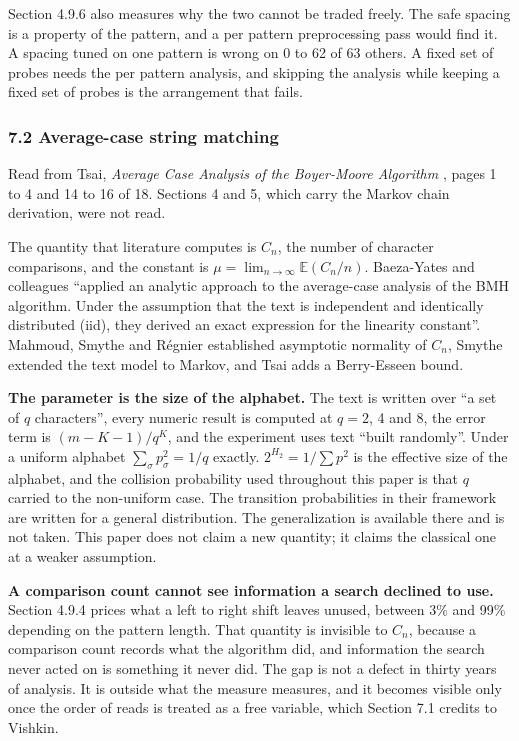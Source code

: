 Section 4.9.6 also measures why the two cannot be traded freely. The safe spacing is a property of the pattern, and a per pattern preprocessing pass would find it. A spacing tuned on one pattern is wrong on 0 to 62 of 63 others. A fixed set of probes needs the per pattern analysis, and skipping the analysis while keeping a fixed set of probes is the arrangement that fails.

\subsubsection{7.2 Average-case string matching}

Read from Tsai, \emph{Average Case Analysis of the Boyer-Moore Algorithm} \cite{src:Tsai}, pages 1 to 4 and 14 to 16 of 18. Sections 4 and 5, which carry the Markov chain derivation, were not read.

The quantity that literature computes is \(C_n\), the number of character comparisons, and the constant is \(\mu = \lim_{n\to\infty} \mathbb{E}(C_n/n)\). Baeza-Yates and colleagues ``applied an analytic approach to the average-case analysis of the BMH algorithm. Under the assumption that the text is independent and identically distributed (iid), they derived an exact expression for the linearity constant''. Mahmoud, Smythe and Régnier established asymptotic normality of \(C_n\), Smythe extended the text model to Markov, and Tsai adds a Berry-Esseen bound.

\noindent\textbf{The parameter is the size of the alphabet.} The text is written over ``a set of \(q\) characters'', every numeric result is computed at \(q = 2\), 4 and 8, the error term is \((m-K-1)/q^K\), and the experiment uses text ``built randomly''. Under a uniform alphabet \(\sum_\sigma p_\sigma^2 = 1/q\) exactly. \(2^{H_2} = 1/\sum p^2\) is the effective size of the alphabet, and the collision probability used throughout this paper is that \(q\) carried to the non-uniform case. The transition probabilities in their framework are written for a general distribution. The generalization is available there and is not taken. This paper does not claim a new quantity; it claims the classical one at a weaker assumption.

\noindent\textbf{A comparison count cannot see information a search declined to use.} Section 4.9.4 prices what a left to right shift leaves unused, between 3\% and 99\% depending on the pattern length. That quantity is invisible to \(C_n\), because a comparison count records what the algorithm did, and information the search never acted on is something it never did. The gap is not a defect in thirty years of analysis. It is outside what the measure measures, and it becomes visible only once the order of reads is treated as a free variable, which Section 7.1 credits to Vishkin.

